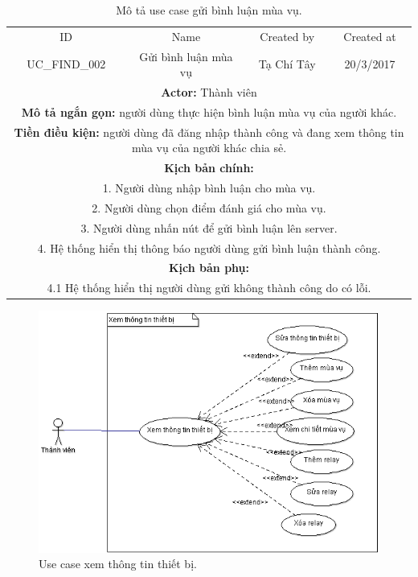 \documentclass[a4paper,12pt,oneside]{article}
\begin{document}
\begin{table}[!htp]
\centering
\begin{tabularx}{\linewidth}{ |c||c|c|c| }
\hline
ID & Name & Created by & Created at\\
UC\_FIND\_002 & Gửi bình luận mùa vụ & Tạ Chí Tây & 20/3/2017\\
\hline
\multicolumn{4}{|X|}{\textbf{Actor:} Thành viên }\\
\hline
\multicolumn{4}{|X|}{\textbf{Mô tả ngắn gọn:} người dùng thực hiện bình luận mùa vụ của người khác.}\\
\hline
\multicolumn{4}{|X|}{\textbf{Tiền điều kiện:} người dùng đã đăng nhập thành công và đang xem thông tin mùa vụ của người khác chia sẻ.}\\
\hline
\multicolumn{4}{|X|}{\textbf{Kịch bản chính:}}\\
\multicolumn{4}{|X|}{ 
1. Người dùng nhập bình luận cho mùa vụ.}\\
\multicolumn{4}{|X|}{ 
2.	Người dùng chọn điểm đánh giá cho mùa vụ.}\\
\multicolumn{4}{|X|}{
3. Người dùng nhấn nút để gửi bình luận lên server.} \\
\multicolumn{4}{|X|}{
4. Hệ thống hiển thị thông báo người dùng gửi bình luận thành công.}\\
\hline
\multicolumn{4}{|X|}{\textbf{Kịch bản phụ:}}\\
\multicolumn{4}{|X|}{4.1	Hệ thống hiển thị người dùng gửi không thành công do có lỗi.}\\
\hline
\end{tabularx}
\caption{Mô tả use case gửi bình luận mùa vụ.}
\end{table}

\begin{figure}[htp]
\centering
\includegraphics[scale=.9]{hinh/tttb.png}
\caption{Use case xem thông tin thiết bị.}
\end{figure}
\end{document}
